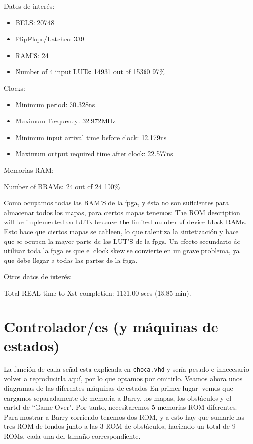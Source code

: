\documentclass[11pt, a4paper, spanish, openright, twoside]{book}
\begin{document}
	Datos de interés:
	\begin{itemize}
	\item BELS: 20748
	\item FlipFlops/Latches: 339
	\item RAM'S: 24
	\item  Number of 4 input LUTs:  14931  out of  15360    97\%  


\end{itemize}
	Clocks:
	\begin{itemize}
	\item  Minimum period: 30.328ns 
	\item 	Maximum Frequency: 32.972MHz
 	\item  Minimum input arrival time before clock: 12.179ns
   	\item Maximum output required time after clock: 22.577ns

\end{itemize}
	Memorias RAM:
	
	Number of BRAMs:    24  out of     24   100\%  

	Como ocupamos todas las RAM'S de la fpga, y ésta no son suficientes para almacenar todos los mapas, para ciertos mapas tenemos:
		The ROM description  will be implemented on LUTs because the limited number of device block RAMs.
	Esto hace que ciertos mapas se cableen, lo que ralentiza la sintetización y hace que se ocupen la mayor parte de las LUT'S de la fpga.
	Un efecto secundario de utilizar toda la fpga es que el clock skew se convierte en un grave problema, ya que debe llegar a todas 
	 las partes de la fpga.

	Otros datos de interés:
	
	Total REAL time to Xst completion: 1131.00 secs (18.85 min).

\section{Controlador/es (y máquinas de estados)}
La función de cada señal esta explicada en \texttt{choca.vhd} y sería pesado e innecesario volver a reproducirla aquí, por lo que optamos por omitirlo.
Veamos ahora unos diagramas de las diferentes máquinas de estados
En primer lugar, vemos que cargamos separadamente de memoria a Barry,  los mapas, los obstáculos y el cartel de ``Game Over". Por tanto, necesitaremos 5 memorias ROM diferentes. Para mostrar a Barry corriendo tenemos dos ROM, y a esto hay que sumarle las tres ROM de fondos junto a las 3 ROM de obstáculos, haciendo un total de 9 ROMs, cada una del tamaño correspondiente. 
\end{document}
